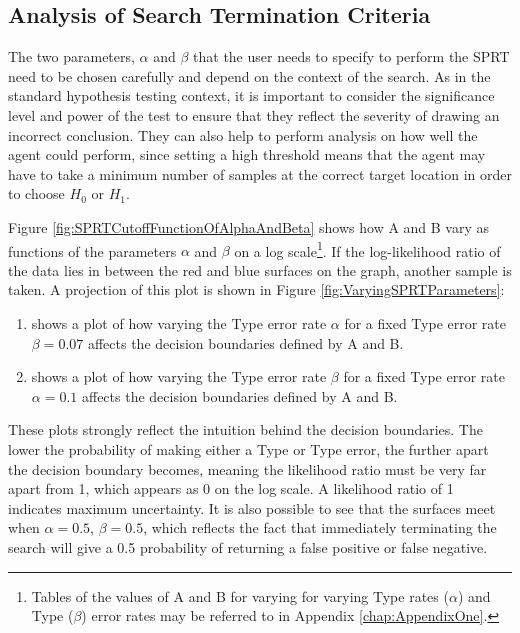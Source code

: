 \subsection{Analysis of Search Termination Criteria}
The two parameters, $\alpha$ and $\beta$ that the user needs to specify to perform the SPRT need to be chosen carefully and depend on the context of the search. As in the standard hypothesis testing context, it is important to consider the significance level and power of the test to ensure that they reflect the severity of drawing an incorrect conclusion. They can also help to perform analysis on how well the agent could perform, since setting a high threshold means that the agent may have to take a minimum number of samples at the correct target location in order to choose $H_0$ or $H_1$. \par

Figure \ref{fig:SPRTCutoffFunctionOfAlphaAndBeta} shows how A and B vary as functions of the parameters $\alpha$ and $\beta$ on a log scale\footnote{Tables of the values of A and B for varying for varying Type  rates ($\alpha$) and Type  ($\beta$) error rates may be referred to in Appendix \ref{chap:AppendixOne}.}. If the log-likelihood ratio of the data lies in between the red and blue surfaces on the graph, another sample is taken. A projection of this plot is shown in Figure \ref{fig:VaryingSPRTParameters}:
\begin{enumerate}[label=(\alph*)]
    \item shows a plot of how varying the Type  error rate $\alpha$ for a fixed Type error rate $\beta = 0.07$ affects the decision boundaries defined by A and B.
    \item shows a plot of how varying the Type error rate $\beta$ for a fixed Type error rate $\alpha = 0.1$ affects the decision boundaries defined by A and B.
\end{enumerate}

These plots strongly reflect the intuition behind the decision boundaries. The lower the probability of making either a Type  or Type  error, the further apart the decision boundary becomes, meaning the likelihood ratio must be very far apart from 1, which appears as 0 on the log scale. A likelihood ratio of 1 indicates maximum uncertainty. It is also possible to see that the surfaces meet when $\alpha=0.5$, $\beta=0.5$, which reflects the fact that immediately terminating the search will give a 0.5 probability of returning a false positive or false negative. \par

